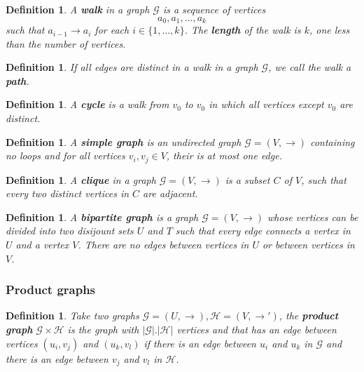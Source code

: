 \documentclass[a4paper,11pt]{report}
\newtheorem{definition}[theorem]{Definition}
\newcommand{\graf}{\mathscr{G}}
\newcommand{\grafeen}{\mathscr{H}}
\begin{document}
  
 
 \begin{definition}

   A  \textbf{walk} in a graph $\graf$ is a sequence of vertices
   $$a_0,a_1,\ldots,a_k$$
   such that $a_{i-1} \to a_i$ for each $i \in \{1,\ldots,k\}$. The \textbf{length} of the walk is $k$, one less
   than the number of vertices. 
 \end{definition}
 
 \begin{definition}
   If all edges are distinct in a  walk in a graph $\graf$, we call the walk a \textbf{path}.
 \end{definition}
 
 \begin{definition}
   A \textbf{cycle} is a walk from $v_0$ to $v_0$ in which all vertices except $v_0$ are distinct. \end{definition}
  
  


\begin{definition}\label{simplegraph} A \textbf{simple graph} is an undirected graph $\graf=(V,\to)$ containing no loops and for all vertices $v_i, v_j \in V$, their is at most one edge.\end{definition}
 
 \begin{definition}\label{clique}
   A \textbf{clique} in a graph $\graf = (V, \to)$ is a subset $C$ of $V$, such 
   that every two distinct vertices in $C$ are adjacent. 
 \end{definition}
 
  \begin{definition}\label{bipartite}
   A \textbf{bipartite graph} is a graph $\graf = (V, \to)$ whose vertices can 
   be divided into two disijount sets $U$ and $T$ such that every edge connects 
   a vertex in $U$ and a vertex $V$. There are no edges between vertices in $U$ 
   or between vertices in $V$.
 \end{definition}
 \subsubsection{Product graphs}
 \begin{definition}\label{productgraph}
   Take two graphs $\graf=(U,\to), \grafeen=(V,\to')$, the \textbf{product graph} $\graf \times \grafeen$ 
   is the graph with $|\graf|.|\grafeen|$ vertices and that has an edge between 
   vertices $(u_i, v_j)$ and $(u_k, v_l)$ if there is an edge between $u_i$ and $u_k$ in $\graf$ and there is an 
   edge between $v_j$ and $v_l$ in $\grafeen$. 
 \end{definition}
 
\end{document}

